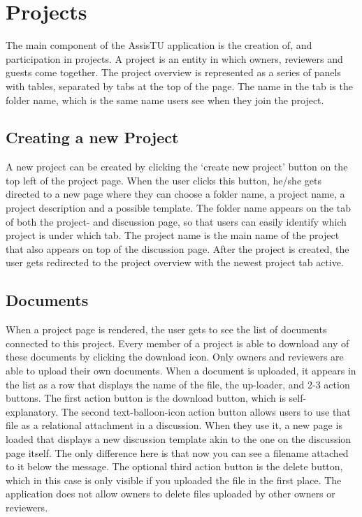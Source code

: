 \section{Projects}
The main component of the AssisTU application is the creation of, and participation in projects. A project is an entity in which owners, reviewers and guests come together. The project overview is represented as a series of panels with tables, separated by tabs at the top of the page. The name in the tab is the folder name, which is the same name users see when they join the project. 

\subsection{Creating a new Project}
A new project can be created by clicking the `create new project' button on the top left of the project page. When the user clicks this button, he/she gets directed to a new page where they can choose a folder name, a project name, a project description and a possible template. The folder name appears on the tab of both the project- and discussion page, so that users can easily identify which project is under which tab. The project name is the main name of the project that also appears on top of the discussion page. After the project is created, the user gets redirected to the project overview with the newest project tab active.

\subsection{Documents}
When a project page is rendered, the user gets to see the list of documents connected to this project. Every member of a project is able to download any of these documents by clicking the download icon. Only owners and reviewers are able to upload their own documents. When a document is uploaded, it appears in the list as a row that displays the name of the file, the up-loader, and 2-3 action buttons. The first action button is the download button, which is self-explanatory. The second text-balloon-icon action button allows users to use that file as a relational attachment in a discussion. When they use it, a new page is loaded that displays a new discussion template akin to the one on the discussion page itself. The only difference here is that now you can see a filename attached to it below the message. The optional third action button is the delete button, which in this case is only visible if you uploaded the file in the first place. The application does not allow owners to delete files uploaded by other owners or reviewers.

